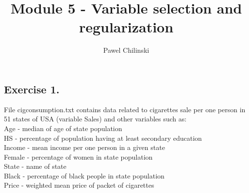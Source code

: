 \documentclass[a4paper]{article}
\title{Module 5 - Variable selection and regularization}
\author{Pawel Chilinski}
\begin{document}

\maketitle
\subsection{Exercise 1.} File cigconsumption.txt contains data related to
cigarettes sale per one person in 51 states of USA (variable Sales) and other variables such as:
\\
Age - median of age of state population\\
HS - percentage of population having at least secondary education\\
Income - mean income per one person in a given state\\
Female - percentage of women in state population\\
State - name of state\\
Black - percentage of black people in state population\\
Price - weighted mean price of packet of cigarettes\\
\end{document}
